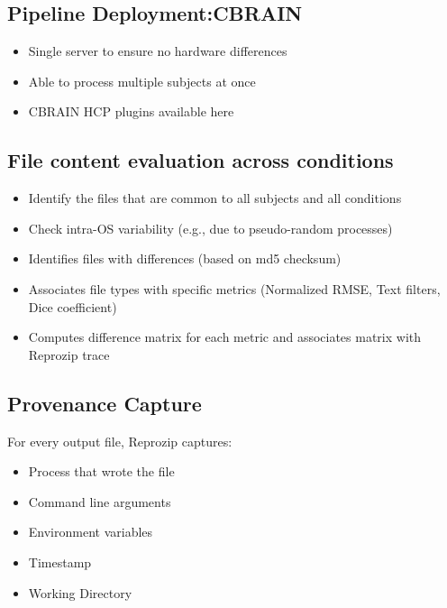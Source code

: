 \subsection{Pipeline Deployment:CBRAIN}
\begin{itemize}
  \item Single server to ensure no hardware differences
  \item Able to process multiple subjects at once
  \item CBRAIN HCP plugins available here
\end{itemize}

\subsection{File content evaluation across conditions}
\begin{itemize}
 \item Identify the files that are common to all subjects and all conditions
 \item Check intra-OS variability (e.g., due to pseudo-random processes)
 \item Identifies files with differences (based on md5 checksum)
 \item Associates file types with specific metrics (Normalized RMSE, Text filters, Dice coefficient)
 \item Computes difference matrix for each metric and associates matrix with Reprozip trace
\end{itemize}

\subsection{Provenance Capture}
\begin{flushleft}
For every output file, Reprozip captures: 
\end{flushleft}
\begin{itemize}
  \item Process that wrote the file
  \item Command line arguments
  \item Environment variables
  \item Timestamp
  \item Working Directory
\end{itemize}


